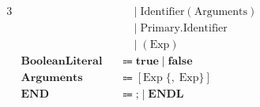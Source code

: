 \documentclass[a4paper,11pt]{article}
\begin{document}
\begin{alignat*}{3}
&                       &&\quad\mid  \text{Identifier}(\text{Arguments}) &&\\
&                       &&\quad\mid  \text{Primary}.\text{Identifier} &&\\
&                       &&\quad\mid  (\text{Exp}) &&\\
&\textbf{BooleanLiteral}  &&\Coloneqq  \textbf{true}\mid\textbf{false} &&\\
&\textbf{Arguments}       &&\Coloneqq  [\text{Exp}\;\lbrace,\;\text{Exp}\rbrace] &&\\
&\textbf{END}              &&\Coloneqq  \textbf{;}\mid\textbf{ENDL} &&
\end{alignat*}
\end{document}
